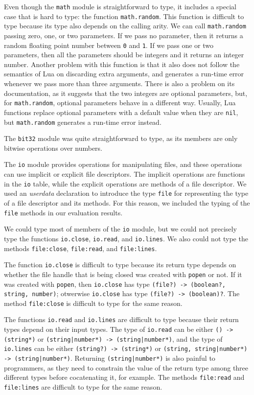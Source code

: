 Even though the \texttt{math} module is straightforward to type,
it includes a special case that is hard to type: the function \texttt{math.random}.
This function is difficult to type because its type also depends
on the calling arity.
We can call \texttt{math.random} passing zero, one, or two parameters.
If we pass no parameter, then it returns a random floating point
number between \texttt{0} and \texttt{1}.
If we pass one or two parameters, then all the parameters should be
integers and it returns an integer number.
Another problem with this function is that it also does not follow
the semantics of Lua on discarding extra arguments, and generates
a run-time error whenever we pass more than three arguments.
There is also a problem on its documentation, as it suggests that
the two integers are optional parameters, but, for \texttt{math.random},
optional parameters behave in a different way.
Usually, Lua functions replace optional parameters with a default value
when they are \texttt{nil}, but \texttt{math.random} generates a run-time
error instead.

The \texttt{bit32} module was quite straightforward to type,
as its members are only bitwise operations over numbers.

The \texttt{io} module provides operations for manipulating files,
and these operations can use implicit or explicit file descriptors.
The implicit operations are functions in the \texttt{io} table,
while the explicit operations are methods of a file descriptor.
We used an \emph{userdata} declaration to introduce the type
\texttt{file} for representing the type of a file descriptor
and its methods.
For this reason, we included the typing of the \texttt{file}
methods in our evaluation results.

We could type most of members of the \texttt{io} module,
but we could not precisely type the functions \texttt{io.close},
\texttt{io.read}, and \texttt{io.lines}.
We also could not type the methods \texttt{file:close},
\texttt{file:read}, and \texttt{file:lines}.

The function \texttt{io.close} is difficult to type
because its return type depends on whether the file handle that is
being closed was created with \texttt{popen} or not.
If it was created with \texttt{popen}, then \texttt{io.close}
has type \texttt{(file?) -> (boolean?, string, number)};
otwerwise \texttt{io.close} has type \texttt{(file?) -> (boolean)?}.
The method \texttt{file:close} is difficult to type for the same reason.

The functions \texttt{io.read} and \texttt{io.lines} are difficult
to type because their return types depend on their input types.
The type of \texttt{io.read} can be either \texttt{() -> (string*)}
or \texttt{(string|number*) -> (string|number*)}, and
the type of \texttt{io.lines} can be either \texttt{(string?) -> (string*)}
or \texttt{(string, string|number*) -> (string|number*)}.
Returning \texttt{(string|number*)} is also painful to programmers, as
they need to constrain the value of the return type among three
different types before cocatenating it, for example.
The methods \texttt{file:read} and \texttt{file:lines} are difficult
to type for the same reason.

